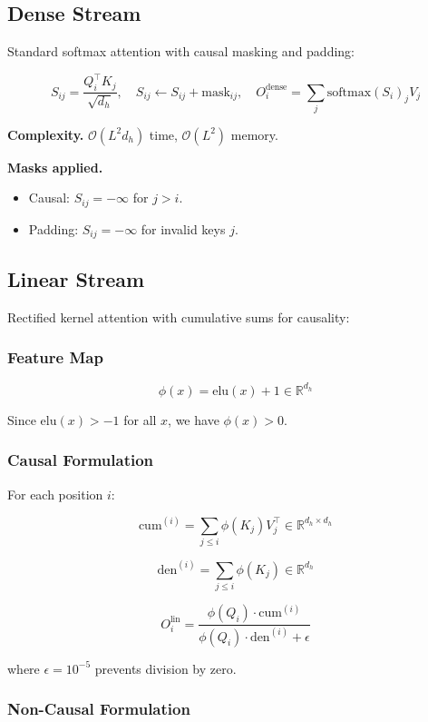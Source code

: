 \subsection{Dense Stream}

Standard softmax attention with causal masking and padding:

\[
S_{ij} = \frac{Q_i^\top K_j}{\sqrt{d_h}}, \quad
S_{ij} \leftarrow S_{ij} + \text{mask}_{ij}, \quad
O^\text{dense}_i = \sum_j \text{softmax}(S_i)_j V_j
\]

\textbf{Complexity.} $\mathcal{O}(L^2 d_h)$ time, $\mathcal{O}(L^2)$ memory.

\textbf{Masks applied.}
\begin{itemize}
\item Causal: $S_{ij} = -\infty$ for $j > i$.
\item Padding: $S_{ij} = -\infty$ for invalid keys $j$.

\end{itemize}
\subsection{Linear Stream}

Rectified kernel attention with cumulative sums for causality:

\subsubsection{Feature Map}

\[
\phi(x) = \mathrm{elu}(x) + 1 \in \mathbb{R}^{d_h}
\]

Since $\mathrm{elu}(x) > -1$ for all $x$, we have $\phi(x) > 0$.

\subsubsection{Causal Formulation}

For each position $i$:

\[
\text{cum}^{(i)} = \sum_{j \le i} \phi(K_j) V_j^\top \in \mathbb{R}^{d_h \times d_h}
\]

\[
\text{den}^{(i)} = \sum_{j \le i} \phi(K_j) \in \mathbb{R}^{d_h}
\]

\[
O^\text{lin}_i = \frac{\phi(Q_i) \cdot \text{cum}^{(i)}}{\phi(Q_i) \cdot \text{den}^{(i)} + \epsilon}
\]

where $\epsilon = 10^{-5}$ prevents division by zero.

\subsubsection{Non-Causal Formulation}

